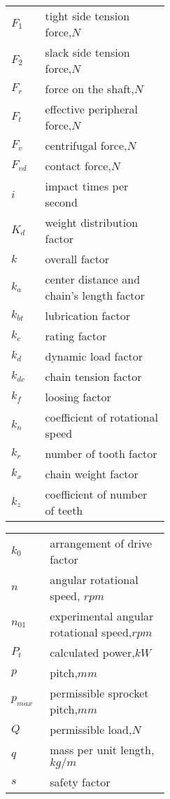 \begin{tabular}[t]{p{0.05\linewidth}p{0.4\linewidth}}
	$ F_1 $ & tight side tension force,$ \unit{N} $\\
	$ F_2 $ & slack side tension force,$ \unit{N} $\\
	$ F_r $ & force on the shaft,$ \unit{N} $\\
	$ F_t $ & effective peripheral force,$ \unit{N} $\\
	$ F_v $ & centrifugal force,$ \unit{N} $\\
	$ F_{vd} $ & contact force,$ \unit{N} $\\
	$ i $ & impact times per second\\
	$ K_d $ & weight distribution factor\\
	$ k $ & overall factor\\
	$ k_a $ & center distance and chain's length factor\\
	$ k_{bt} $ & lubrication factor\\
	$ k_c $ & rating factor\\
	$ k_d $ & dynamic load factor\\
	$ k_{dc} $ & chain tension  factor\\
	$ k_f $ & loosing factor\\
	$ k_n $ & coefficient of rotational speed\\
	$ k_r $ & number of tooth factor\\
	$ k_x $ & chain weight factor\\
	$ k_z $ & coefficient of number of teeth\\
\end{tabular}\newpage\noindent
\begin{tabular}[t]{p{0.05\linewidth}p{0.4\linewidth}}
	$ k_0 $ & arrangement of drive factor\\
	$ n $ & angular rotational speed, $ \unit{rpm} $\\
	$ n_{01} $ & experimental angular rotational speed,$ \unit{rpm} $\\
	$ P_t $ & calculated power,$ \unit{kW} $\\
	$ p $ & pitch,$ \unit{mm} $\\
	$ p_{max} $ & permissible sprocket pitch,$ \unit{mm} $\\
	$ Q $ & permissible load,$ \unit{N} $\\
	$ q $ & mass per unit length,$ \unit{kg/m} $\\
	$ s $ & safety factor\\
\end{tabular}%
